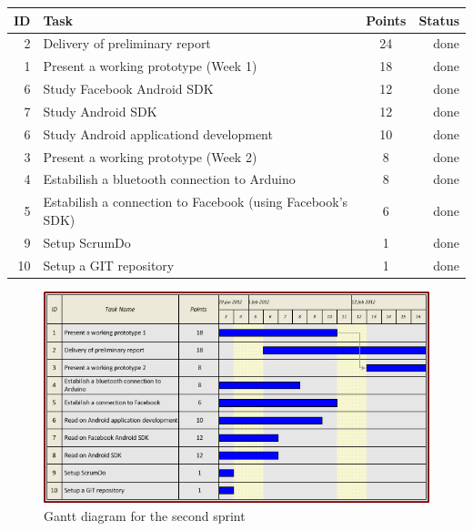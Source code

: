 \begin{table}[ht!]
\begin{tabular}{ | r | l | c | r | }

\hline
\textbf{ID} & \textbf{Task} & \textbf{Points} & \textbf{Status} \\
\hline

2 & Delivery of preliminary report          & 24 & done \\
\hline
1 & Present a working prototype	(Week 1)	& 18 & done \\
\hline
6 & Study Facebook Android SDK          & 12 & done \\
\hline
7 & Study Android SDK               & 12 & done \\
\hline
6 & Study Android applicationd development      & 10 & done \\
\hline
3 & Present a working prototype	(Week 2)	& 8  & done \\
\hline
4 & Estabilish a bluetooth connection to Arduino	& 8  & done \\
\hline
5 & Estabilish a connection to Facebook
(using Facebook's SDK)				& 6  & done \\
\hline
9 & Setup ScrumDo					& 1  & done \\
\hline
10 & Setup a GIT repository          & 1  & done \\
\hline

\end{tabular}
\end{table}

\begin{figure}[h!]
\centering \includegraphics[scale=0.8]{img/sprints-gantt2.png}
\caption{Gantt diagram for the second sprint}
\label{fig:sprints-gantt2}
\end{figure}

\newpage

